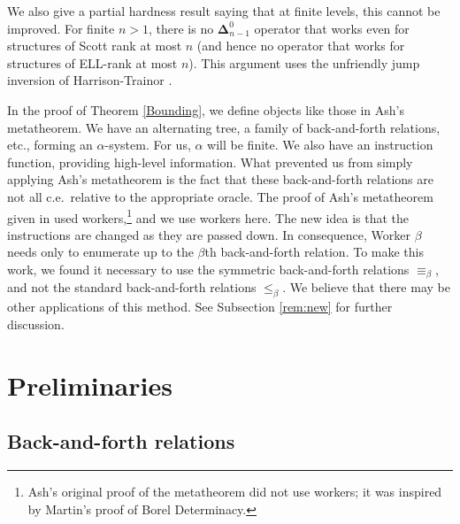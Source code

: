 \documentclass[10pt,a4paper]{article}
\newcommand{\ELL}{\textnormal{ELL}}
\newcommand{\bfDelta}{\boldsymbol{\Delta}}
\theoremstyle{definition}
\begin{document}
	We also give a partial hardness result saying that at finite levels, this cannot be improved.  For finite $n > 1$, there is no $\bfDelta^0_{n-1}$ operator that works even for structures of Scott rank at most $n$ (and hence no operator that works for structures of \ELL-rank at most $n$). This argument uses the unfriendly jump inversion of Harrison-Trainor \cite{unfriendly}.
	
	In the proof of Theorem \ref{Bounding}, we define objects like those in Ash's metatheorem. We have an alternating tree, a family of back-and-forth relations, etc., forming an $\alpha$-system. For us, $\alpha$ will be finite. We also have an instruction function, providing high-level information. What prevented us from simply applying Ash's metatheorem is the fact that these back-and-forth relations are not all c.e.\ relative to the appropriate oracle. The proof of Ash's metatheorem given in \cite{AK00} used workers,\footnote{ Ash's original proof of the metatheorem did not use workers; it was inspired by Martin's proof of Borel Determinacy. } and we use workers here. The new idea is that the instructions are changed as they are passed down. In consequence, Worker $\beta$ needs only to enumerate up to the $\beta$th back-and-forth relation. To make this work, we found it necessary to use the symmetric back-and-forth relations $\equiv_\beta$, and not the standard back-and-forth relations $\leq_\beta$. We believe that there may be other applications of this method. See Subsection \ref{rem:new} for further discussion. 
	
	\section{Preliminaries}
	
	\subsection{Back-and-forth relations} 
	
\end{document}
